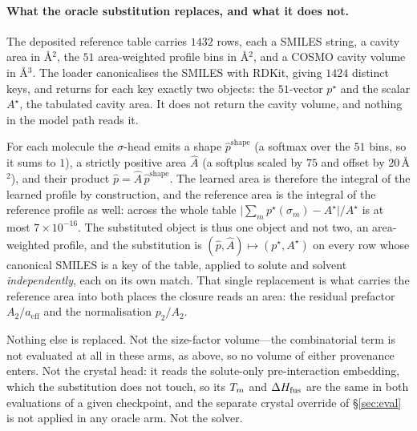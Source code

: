 \paragraph{What the oracle substitution replaces, and what it does not.} The deposited reference table
carries $1432$ rows, each a SMILES
string, a cavity area in \AA$^2$, the $51$ area-weighted profile bins
in \AA$^2$, and a COSMO cavity volume
in \AA$^3$. The loader canonicalises the SMILES with RDKit, giving $1424$ distinct
keys, and returns for each key exactly two objects: the $51$-vector $p^\star$ and the scalar
$A^\star$, the tabulated cavity area. It does not return the cavity volume, and nothing in the model path
reads it.

For each molecule the $\sigma$-head emits a shape $\hat p^{\mathrm{shape}}$ (a softmax over the $51$
bins, so it sums to $1$), a strictly positive area $\hat A$ (a softplus scaled by $75$ and offset by
$20$\,\AA$^2$), and their product $\hat p=\hat A\,\hat p^{\mathrm{shape}}$. The learned area is
therefore the integral of the learned profile by construction, and the reference area is the
integral of the reference profile as well: across the whole table $\lvert\sum_m p^\star(\sigma_m) -
A^\star\rvert/A^\star$ is at most $7\times10^{-16}$. The substituted object is thus one object and
not two, an area-weighted profile, and the substitution is $(\hat p,\hat A)\mapsto(p^\star,A^\star)$
on every row whose canonical SMILES is a key of the table,
applied to solute and solvent \emph{independently}, each on its own match. That single replacement
is what carries the reference area into both places the closure reads an area: the residual
prefactor $A_2/a_{\mathrm{eff}}$ and the normalisation $p_2/A_2$.

Nothing else is replaced. Not the size-factor volume---the combinatorial term is not evaluated at
all in these arms, as above, so no volume of either provenance enters. Not the crystal head: it
reads the solute-only pre-interaction embedding, which the substitution does not touch, so its
$T_m$ and $\Delta H_{\mathrm{fus}}$ are the same in both evaluations of a given checkpoint, and the separate crystal
override of \S\ref{sec:eval} is not applied in any oracle arm. Not the solver.

